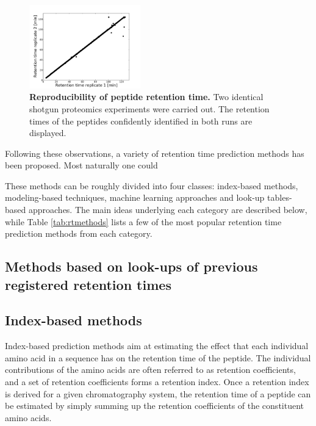 \documentclass[a4paper]{article}
\begin{document}
\begin{figure}
\vspace{-10pt}
\centering
\includegraphics[trim=0.5cm 0cm 2cm 1.5cm, clip=true, width=0.43\textwidth]{img/reproducibility.pdf}
\caption{\label{fig:repr} {\bf Reproducibility of peptide retention time.} Two identical shotgun proteomics experiments were carried out. The retention times of the peptides confidently identified in both runs are displayed.}
\vspace{-25pt}
\end{figure}

Following these observations, a variety of retention time prediction
methods has been proposed. Most naturally one could 


These methods can be roughly divided into four classes: index-based
methods, modeling-based techniques, machine learning approaches and
look-up tables-based approaches. The main ideas underlying each
category are described below, while Table \ref{tab:rtmethods} lists a
few of the most popular retention time prediction methods from each
category.

\subsection{Methods based on look-ups of previous registered retention times}

\cite{irt}

\subsection{Index-based methods}

Index-based prediction methods aim at estimating the effect that each
individual amino acid in a sequence has on the retention time of the
peptide. The individual contributions of the amino acids are often
referred to as retention coefficients, and a set of retention
coefficients forms a retention index. Once a retention index is
derived for a given chromatography system, the retention time of a
peptide can be estimated by simply summing up the retention
coefficients of the constituent amino acids.
\end{document}
